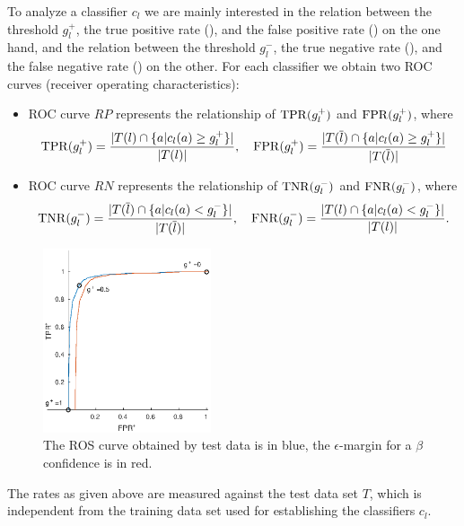 To analyze a classifier $c_l$ we are mainly interested in the relation between the threshold $g_l^+$, the true positive rate (\TPR), and the false positive rate (\FPR) on the one hand, and the relation between the threshold $g_l^-$, 
the true negative rate (\TNR), and the false negative rate (\FNR) on the other.
For each classifier we obtain two ROC curves (receiver operating characteristics):
\begin{itemize}
\item ROC curve $RP$ represents the relationship of $\mathrm{TPR}(g_l^+)$ and $\mathrm{FPR}(g_l^+)$,
where
\begin{gather*}
    \mathrm{TPR}(g_l^+) = \frac{ | T(l) \cap \{a |c_l(a) \geq g_l^+ \}|}{|T(l)|},\quad
    \mathrm{FPR}(g_l^+) = \frac{ | T(\overline l) \cap \{a| c_l(a) \geq g_l^+ \}|}{|T(\overline l)|}
\end{gather*}
\item ROC curve $RN$ represents the relationship of $\mathrm{TNR}(g_l^-)$ and $\mathrm{FNR}(g_l^-)$, where
\begin{gather*}
    \mathrm{TNR}(g_l^-) = \frac{ | T(\overline l) \cap \{a|c_l(a) < g_l^- \}|}{|T(\overline l)|},\quad
    \mathrm{FNR}(g_l^-) = \frac{ | T(l) \cap \{a|c_l(a) < g_l^- \}|}{|T(l)|}.
\end{gather*}
\end{itemize}

\begin{figure}
    \vspace{-3em}
    \centering
    \includegraphics[width=0.44\textwidth]{ros}
    \caption{The ROS curve obtained by test data is in blue, the $\epsilon$-margin for a $\beta$ confidence is in red.}
    \label{fig:ros}
\end{figure}
The rates as given above are measured against the test data set $T$, which is independent from the training data set used for establishing the classifiers $c_l$. 

